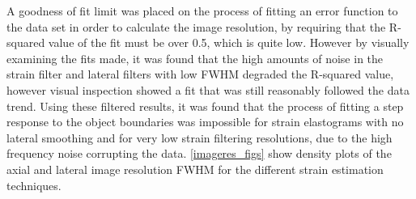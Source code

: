 A goodness of fit limit was placed on the process of fitting an error function to the data set in order to calculate the image resolution, by requiring that the R-squared value of the fit must be over 0.5, which is quite low. However by visually examining the fits made, it was found that the high amounts of noise in the strain filter and lateral filters with low FWHM degraded the R-squared value, however visual inspection showed a fit that was still reasonably followed the data trend. Using these filtered results, it was found that the process of fitting a step response to the object boundaries was impossible for strain elastograms with no lateral smoothing and for very low strain filtering resolutions, due to the high frequency noise corrupting the data. \autoref{imageres_figs} show density plots of the axial and lateral image resolution FWHM for the different strain estimation techniques.


